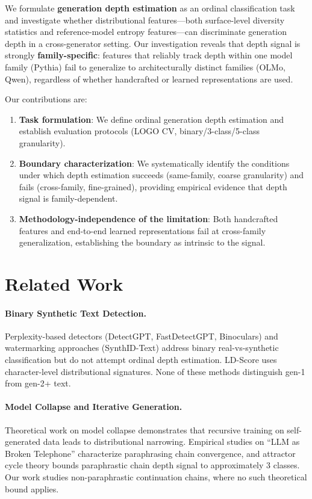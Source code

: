 \documentclass[11pt,a4paper]{article}
\begin{document}
We formulate \textbf{generation depth estimation} as an ordinal classification task and investigate whether distributional features---both surface-level diversity statistics and reference-model entropy features---can discriminate generation depth in a cross-generator setting.
Our investigation reveals that depth signal is strongly \textbf{family-specific}: features that reliably track depth within one model family (Pythia) fail to generalize to architecturally distinct families (OLMo, Qwen), regardless of whether handcrafted or learned representations are used.

Our contributions are:
\begin{enumerate}
    \item \textbf{Task formulation}: We define ordinal generation depth estimation and establish evaluation protocols (LOGO CV, binary/3-class/5-class granularity).
    \item \textbf{Boundary characterization}: We systematically identify the conditions under which depth estimation succeeds (same-family, coarse granularity) and fails (cross-family, fine-grained), providing empirical evidence that depth signal is family-dependent.
    \item \textbf{Methodology-independence of the limitation}: Both handcrafted features and end-to-end learned representations fail at cross-family generalization, establishing the boundary as intrinsic to the signal.
\end{enumerate}

\section{Related Work}

\paragraph{Binary Synthetic Text Detection.}
Perplexity-based detectors (DetectGPT, FastDetectGPT, Binoculars) and watermarking approaches (SynthID-Text) address binary real-vs-synthetic classification but do not attempt ordinal depth estimation.
LD-Score uses character-level distributional signatures.
None of these methods distinguish gen-1 from gen-2+ text.

\paragraph{Model Collapse and Iterative Generation.}
Theoretical work on model collapse demonstrates that recursive training on self-generated data leads to distributional narrowing.
Empirical studies on ``LLM as Broken Telephone'' characterize paraphrasing chain convergence, and attractor cycle theory bounds paraphrastic chain depth signal to approximately 3 classes.
Our work studies non-paraphrastic continuation chains, where no such theoretical bound applies.
\end{document}
